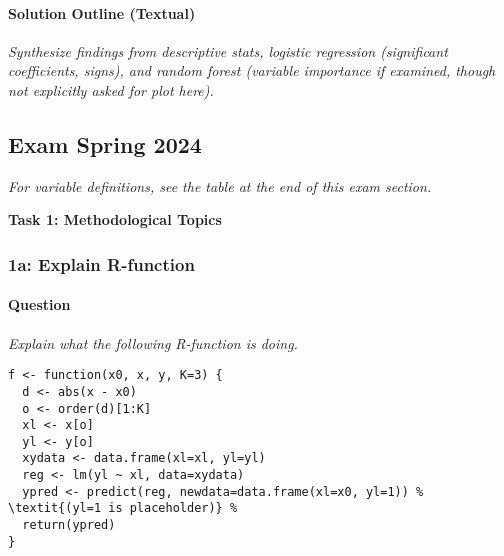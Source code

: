 \documentclass[12pt,a4paper]{article}
\begin{document}
        \paragraph{Solution Outline (Textual)}
        \textit{Synthesize findings from descriptive stats, logistic regression (significant coefficients, signs), and random forest (variable importance if examined, though not explicitly asked for plot here).}

\subsection{Exam Spring 2024}
    \textit{For variable definitions, see the table at the end of this exam section.}

\textbf{\Large Task 1: Methodological Topics}
\vspace{0.5em}

    \subsubsection{1a: Explain R-function}
        \paragraph{Question}
        \textit{Explain what the following R-function is doing.}
\begin{lstlisting}[caption={R-function f for 1a (Exam 2024)}]
f <- function(x0, x, y, K=3) {
  d <- abs(x - x0)       
  o <- order(d)[1:K]     
  xl <- x[o]             
  yl <- y[o]             
  xydata <- data.frame(xl=xl, yl=yl) 
  reg <- lm(yl ~ xl, data=xydata)    
  ypred <- predict(reg, newdata=data.frame(xl=x0, yl=1)) % \textit{(yl=1 is placeholder)} %
  return(ypred)
}
\end{lstlisting}
\end{document}
